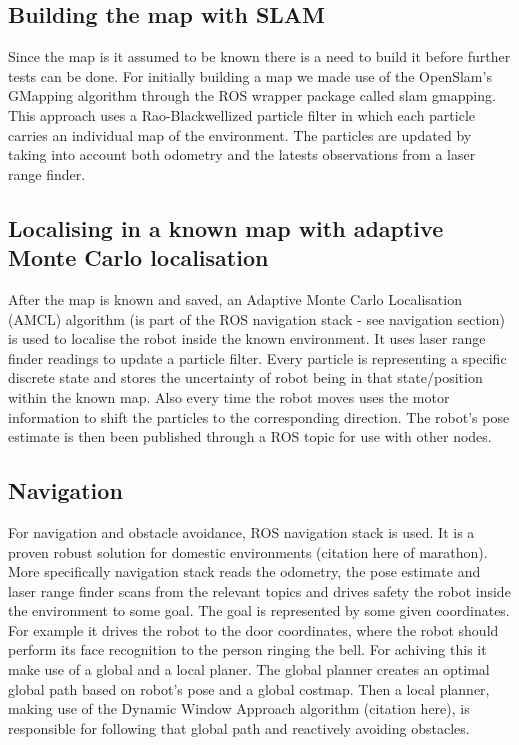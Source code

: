 \documentclass[conference]{IEEEtran}
\begin{document}
\subsection{Building the map with SLAM}
Since the map is it assumed to be known there is a need to build it before further tests can be done. For initially building a map we made use of the OpenSlam's GMapping algorithm \cite{slam} through the ROS wrapper package called slam gmapping. This approach uses a Rao-Blackwellized particle filter in which each particle carries an individual map of the environment.  The particles are updated by taking into account both odometry and the latests observations from a laser range finder.

\subsection{Localising in a known map with adaptive Monte Carlo localisation}
After the map is known and saved, an Adaptive Monte Carlo Localisation (AMCL)\cite{amcl} algorithm (is part of the ROS navigation stack - see navigation section) is used to localise the robot inside the known environment. It uses laser range finder readings to update a particle filter. Every particle is representing a specific discrete state and stores the uncertainty of robot being in that state/position within the known map. Also every time the robot moves uses the motor information to shift the particles to the corresponding direction. The robot's pose estimate is then been published through a ROS topic for use with other nodes.

\subsection{Navigation}
For navigation and obstacle avoidance, ROS navigation stack is used. It is a proven robust solution for domestic environments (citation here of marathon). More specifically navigation stack reads the odometry, the pose estimate and laser range finder scans from the relevant topics and drives safety the robot inside the environment to some goal. The goal is represented by some given coordinates. For example it drives the robot to the door coordinates, where the robot should perform its face recognition to the person ringing the bell. For achiving this it make use of a global and a local planer. The global planner creates an optimal global path based on robot's pose and a global costmap. Then a local planner, making use of the Dynamic Window Approach algorithm (citation here), is responsible for following that global path and reactively avoiding obstacles.
\end{document}
